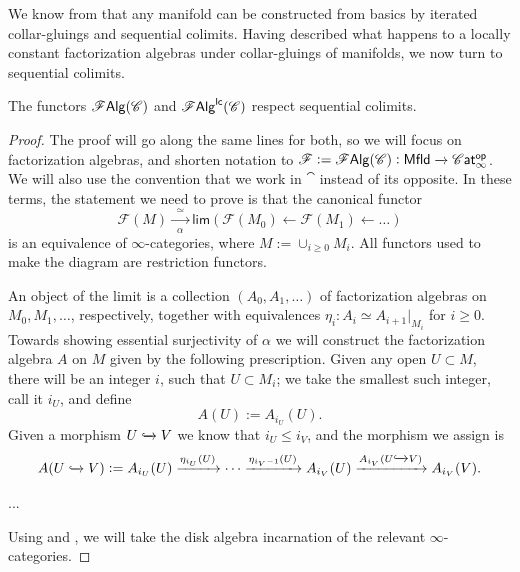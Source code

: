 \documentclass[../text]{subfiles}
\begin{document}
We know from  that any manifold can be constructed from basics by iterated collar-gluings and sequential colimits. Having described what happens to a locally constant factorization algebras under collar-gluings of manifolds, we now turn to sequential colimits.

\begin{proposition}
    The functors $\mathscr{F} \mathsf{Alg}(\mathscr{C})$ and $\mathscr{F} \mathsf{Alg}^{\mathsf{lc}}(\mathscr{C})$ respect sequential colimits.
\end{proposition}

\begin{proof}
    The proof will go along the same lines for both, so we will focus on factorization algebras, and shorten notation to $\mathscr{F} := \falg (\catC): \mfld[r] \xrightarrow{} \cat^{\mathsf{op}}$. We will also use the convention that we work in $\cat$ instead of its opposite. In these terms, the statement we need to prove is that the canonical functor
    \begin{equation}
        \mathscr{F}(M) \xrightarrow[\alpha]{\ \ \simeq \ \ } \mathsf{lim} (\mathscr{F}(M_0) \xleftarrow{} \mathscr{F}(M_1) \xleftarrow{} \dots)
    \end{equation}
    is an equivalence of $\infty$-categories, where $M := \cup_{i \geq 0} M_i$. All functors used to make the diagram are restriction functors. 

    An object of the limit is a collection $(A_0, A_1, \dots)$ of factorization algebras on $M_0, M_1, \dots$, respectively, together with equivalences $\eta_i: A_i \simeq A_{i+1}|_{M_i}$ for $i \geq 0$. Towards showing essential surjectivity of $\alpha$ we will construct the factorization algebra $A$ on $M$ given by the following prescription. Given any open $U \subset M$, there will be an integer $i$, such that $U \subset M_i$; we take the smallest such integer, call it $i_U$, and define
    \begin{equation}
        A(U) := A_{i_U} (U).
    \end{equation}
    Given a morphism $U \xhookrightarrow{} V$ we know that $i_U \leq i_V$, and the morphism we assign is
    \begin{equation}
        A(U \xhookrightarrow{} V) := A_{i_U}(U) \xrightarrow{\eta_{i_U}(U)} \cdots \xrightarrow{\eta_{i_V - 1}(U)} A_{i_V} (U) \xrightarrow{A_{i_V} (U \xhookrightarrow{} V)} A_{i_V} (V).
    \end{equation} 
    
    ...
    
    Using  and , we will take the disk algebra incarnation of the relevant $\infty$-categories.
\end{proof}
\end{document}
